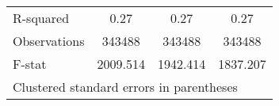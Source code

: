 {\begin{tabular}{l*{3}{c}}
                    
                    \hline
R-squared           &        0.27         &        0.27         &        0.27         \\
Observations        &      343488         &      343488         &      343488         \\
F-stat              &    2009.514         &    1942.414         &    1837.207         \\
\hline\hline
\multicolumn{4}{l}{\footnotesize Clustered standard errors in parentheses}\\
\end{tabular}
}
